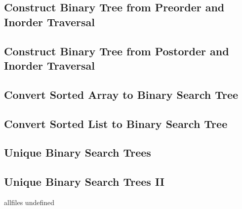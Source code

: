 \documentclass{article}
\begin{document}
\begin{CJK}{UTF8}{gbsn}     %

\else
	
\subsection{Construct Binary Tree from Preorder and Inorder Traversal}

\subsection{Construct Binary Tree from Postorder and Inorder Traversal}

\subsection{Convert Sorted Array to Binary Search Tree}

\subsection{Convert Sorted List to Binary Search Tree}

\subsection{Unique Binary Search Trees}

\subsection{Unique Binary Search Trees II}


\fi

\ifx allfiles undefined
\end{CJK}
\end{document}

